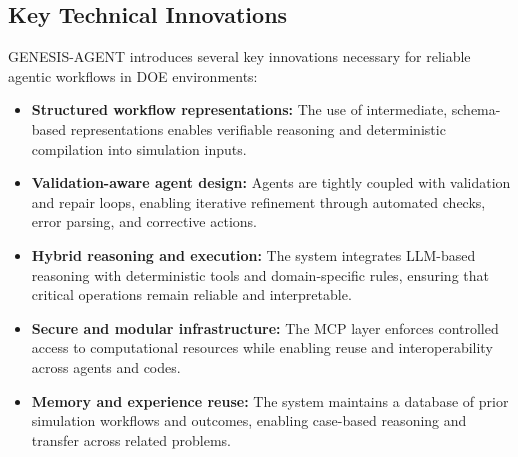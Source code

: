 \documentclass[11pt]{article} \usepackage[margin=1in]{geometry}
\begin{document}

\subsection*{Key Technical Innovations}

GENESIS-AGENT introduces several key innovations necessary for reliable agentic
workflows in DOE environments:

\begin{itemize} \item \textbf{Structured workflow representations:} The use of
intermediate, schema-based representations enables verifiable reasoning and
deterministic compilation into simulation inputs.
    
    \item \textbf{Validation-aware agent design:} Agents are tightly coupled
with validation and repair loops, enabling iterative refinement through
automated checks, error parsing, and corrective actions.
    
    \item \textbf{Hybrid reasoning and execution:} The system integrates
LLM-based reasoning with deterministic tools and domain-specific rules, ensuring
that critical operations remain reliable and interpretable.
    
    \item \textbf{Secure and modular infrastructure:} The MCP layer enforces
controlled access to computational resources while enabling reuse and
interoperability across agents and codes.
    
    \item \textbf{Memory and experience reuse:} The system maintains a database
of prior simulation workflows and outcomes, enabling case-based reasoning and
transfer across related problems.  \end{itemize}
\end{document}
